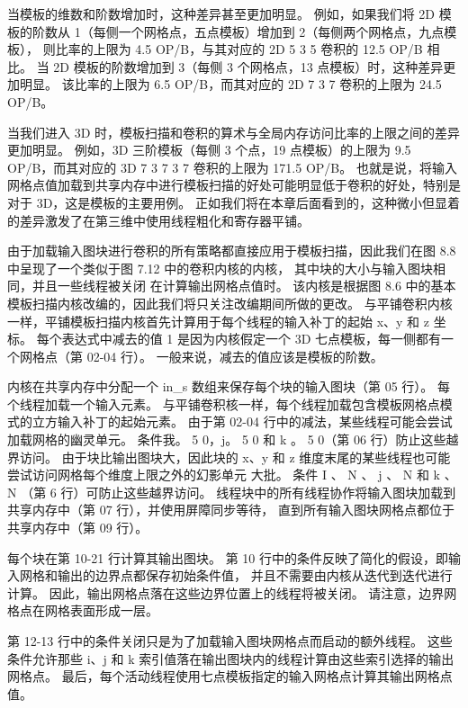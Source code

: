 当模板的维数和阶数增加时，这种差异甚至更加明显。 
例如，如果我们将 2D 模板的阶数从 1（每侧一个网格点，五点模板）增加到 2（每侧两个网格点，九点模板），
则比率的上限为 4.5 OP/B，与其对应的 2D 5 3 5 卷积的 12.5 OP/B 相比。 
当 2D 模板的阶数增加到 3（每侧 3 个网格点，13 点模板）时，这种差异更加明显。 
该比率的上限为 6.5 OP/B，而其对应的 2D 7 3 7 卷积的上限为 24.5 OP/B。

当我们进入 3D 时，模板扫描和卷积的算术与全局内存访问比率的上限之间的差异更加明显。 
例如，3D 三阶模板（每侧 3 个点，19 点模板）的上限为 9.5 OP/B，而其对应的 3D 7 3 7 3 7 卷积的上限为 171.5 OP/B。 
也就是说，将输入网格点值加载到共享内存中进行模板扫描的好处可能明显低于卷积的好处，特别是对于 3D，这是模板的主要用例。 
正如我们将在本章后面看到的，这种微小但显着的差异激发了在第三维中使用线程粗化和寄存器平铺。

由于加载输入图块进行卷积的所有策略都直接应用于模板扫描，因此我们在图 8.8 中呈现了一个类似于图 7.12 中的卷积内核的内核，
其中块的大小与输入图块相同，并且一些线程被关闭 在计算输出网格点值时。 
该内核是根据图 8.6 中的基本模板扫描内核改编的，因此我们将只关注改编期间所做的更改。 
与平铺卷积内核一样，平铺模板扫描内核首先计算用于每个线程的输入补丁的起始 x、y 和 z 坐标。 
每个表达式中减去的值 1 是因为内核假定一个 3D 七点模板，每一侧都有一个网格点（第 02-04 行）。 
一般来说，减去的值应该是模板的阶数。

内核在共享内存中分配一个 in\_s 数组来保存每个块的输入图块（第 05 行）。 每个线程加载一个输入元素。 
与平铺卷积核一样，每个线程加载包含模板网格点模式的立方输入补丁的起始元素。 
由于第 02-04 行中的减法，某些线程可能会尝试加载网格的幽灵单元。 条件我。 5 0，j。 5 0 和 k 。 
5 0（第 06 行）防止这些越界访问。 
由于块比输出图块大，因此块的 x、y 和 z 维度末尾的某些线程也可能尝试访问网格每个维度上限之外的幻影单元 大批。 
条件 I 、 N 、 j 、 N 和 k 、 N （第 6 行）可防止这些越界访问。 
线程块中的所有线程协作将输入图块加载到共享内存中（第 07 行），并使用屏障同步等待，
直到所有输入图块网格点都位于共享内存中（第 09 行）。

每个块在第 10-21 行计算其输出图块。 第 10 行中的条件反映了简化的假设，即输入网格和输出的边界点都保存初始条件值，
并且不需要由内核从迭代到迭代进行计算。 因此，输出网格点落在这些边界位置上的线程将被关闭。 
请注意，边界网格点在网格表面形成一层。

第 12-13 行中的条件关闭只是为了加载输入图块网格点而启动的额外线程。 
这些条件允许那些 i、j 和 k 索引值落在输出图块内的线程计算由这些索引选择的输出网格点。 
最后，每个活动线程使用七点模板指定的输入网格点计算其输出网格点值。

